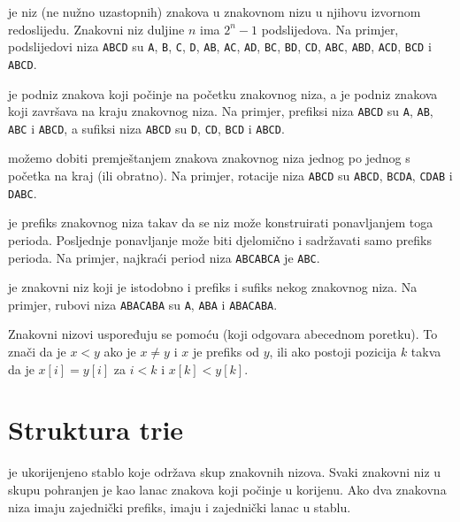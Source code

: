  je niz
(ne nužno uzastopnih) znakova
u znakovnom nizu u njihovu izvornom redoslijedu.
Znakovni niz duljine $n$ ima $2^n-1$ podslijedova.
Na primjer, podslijedovi niza
\texttt{ABCD} su
\texttt{A}, \texttt{B}, \texttt{C}, \texttt{D},
\texttt{AB}, \texttt{AC}, \texttt{AD},
\texttt{BC}, \texttt{BD}, \texttt{CD},
\texttt{ABC}, \texttt{ABD}, \texttt{ACD},
\texttt{BCD} i \texttt{ABCD}.


 je podniz znakova koji počinje na početku
znakovnog niza,
a  je podniz znakova koji završava na kraju
znakovnog niza.
Na primjer,
prefiksi niza \texttt{ABCD} su
\texttt{A}, \texttt{AB}, \texttt{ABC} i \texttt{ABCD},
a sufiksi niza \texttt{ABCD} su
\texttt{D}, \texttt{CD}, \texttt{BCD} i \texttt{ABCD}.


 možemo dobiti premještanjem
znakova znakovnog niza jednog po jednog s početka
na kraj (ili obratno).
Na primjer, rotacije niza \texttt{ABCD} su
\texttt{ABCD}, \texttt{BCDA}, \texttt{CDAB} i \texttt{DABC}.


 je prefiks znakovnog niza takav da se
niz može konstruirati ponavljanjem toga perioda.
Posljednje ponavljanje može biti djelomično i sadržavati
samo prefiks perioda.
Na primjer, najkraći period niza
\texttt{ABCABCA} je \texttt{ABC}.


 je znakovni niz koji je istodobno
i prefiks i sufiks nekog znakovnog niza.
Na primjer, rubovi niza \texttt{ABACABA}
su \texttt{A}, \texttt{ABA} i \texttt{ABACABA}.


Znakovni nizovi uspoređuju se pomoću 
(koji odgovara abecednom poretku).
To znači da je $x<y$ ako je $x \neq y$ i $x$ je prefiks od $y$,
ili ako postoji pozicija $k$ takva da je
$x[i]=y[i]$ za $i<k$ i $x[k]<y[k]$.

\section{Struktura trie}


 je ukorijenjeno stablo koje
održava skup znakovnih nizova.
Svaki znakovni niz u skupu pohranjen je kao
lanac znakova koji počinje u korijenu.
Ako dva znakovna niza imaju zajednički prefiks,
imaju i zajednički lanac u stablu.

